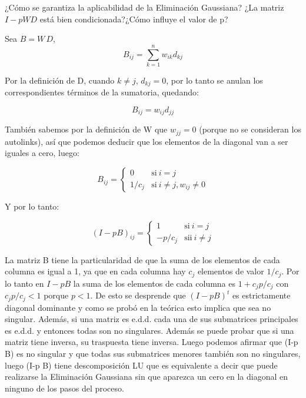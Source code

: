 \documentclass[a4paper]{article}
\begin{document}
¿Cómo se garantiza la aplicabilidad de la Eliminación Gaussiana? ¿La matriz $I-pWD$ está bien condicionada?¿Cómo influye el valor de p?

Sea $B=W\,D$,
\begin{displaymath}
B_{ij}=\sum_{k=1}^n w_{ik}d_{kj}
\end{displaymath}

Por la definición de D, cuando $k\not=j$, $d_{kj}=0$, por lo tanto se anulan los correspondientes términos de la sumatoria, quedando:

\begin{displaymath}
B_{ij}=w_{ij}d_{jj}
\end{displaymath}

También sabemos por la definición de W que $w_{jj}=0$ (porque no se consideran los autolinks), así que podemos deducir que los elementos de la diagonal van a ser iguales a cero, luego:

\begin{equation}
 B_{ij} = \left\{
    \begin{array}{ll}
	 0 & \mathrm{si\ } i=j \\
	 1/c_j & \mathrm{si\ } i\not=j,  w_{ij}\not=0
	 \end{array}
   \right.
\end{equation}

Y por lo tanto:

\begin{equation}
(I-p B)_{ij} = \left\{
    \begin{array}{ll}
	 1 & \mathrm{si\ } i=j \\
	 -p/c_j & \mathrm{sii\ } i\not=j
	 \end{array}
   \right.
\end{equation}

La matriz B tiene la particularidad de que la suma de los elementos de cada columna es igual a 1, ya que en cada columna hay $c_j$ elementos de valor $1/c_j$. Por lo tanto en $I-p B$ la suma de los elementos de cada columna es $1+c_j p/c_j$ con $c_j p/c_j<1$ porque $p<1$. De esto se desprende que $(I-p B)^t$ es estrictamente diagonal dominante y como se probó en la teórica esto implica que sea no singular. Además, si una matriz es e.d.d. cada una de sus submatrices principales es e.d.d. y entonces todas son no singulares. Además se puede probar que si una matriz tiene inversa, su traspuesta tiene inversa. Luego podemos afirmar que (I-p B) es no singular y que todas sus submatrices menores también son no singulares, luego (I-p B) tiene descomposición LU que es equivalente a decir que puede realizarse la Eliminación Gaussiana sin que aparezca un cero en la diagonal en ninguno de los pasos del proceso.
\end{document}
